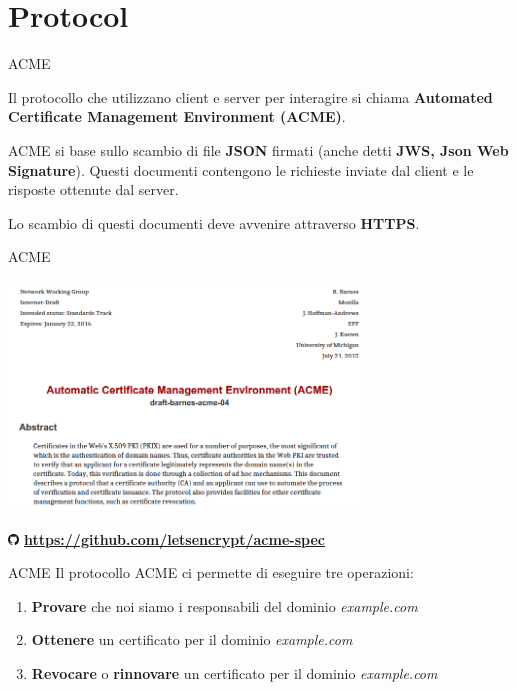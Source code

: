 \documentclass[xcolor=svgnames,11pt]{beamer}
\begin{document}
\section{Protocol}

\begin{frame}{ACME}

\begin{block}{}
Il protocollo che utilizzano client e server per interagire si chiama \textbf{Automated Certificate Management Environment (ACME)}.
\end{block}

\medskip \pause
ACME si base sullo scambio di file \textbf{JSON} firmati (anche detti \textbf{JWS, Json Web Signature}).
Questi documenti contengono le richieste inviate dal client e le risposte ottenute dal server.

\medskip \pause
Lo scambio di questi documenti deve avvenire attraverso \textbf{HTTPS}.
\end{frame}

\begin{frame}{ACME}
\begin{center}
\includegraphics[width=9.5cm]{img/acme_spec.png}

\includegraphics[width=0.3cm]{img/logo_gh.pdf} \textbf{ \url{https://github.com/letsencrypt/acme-spec}}
\end{center}
\end{frame}

\begin{frame}{ACME}
Il protocollo ACME ci permette di eseguire tre operazioni:
\pause\medskip
\begin{enumerate}
  \item \textbf{Provare} che noi siamo i responsabili del dominio \emph{example.com}
  \pause\medskip
  \item \textbf{Ottenere} un certificato per il dominio \emph{example.com}
  \pause\medskip
  \item \textbf{Revocare} o \textbf{rinnovare} un certificato per il dominio \emph{example.com}
\end{enumerate}
\end{frame}
\end{document}
